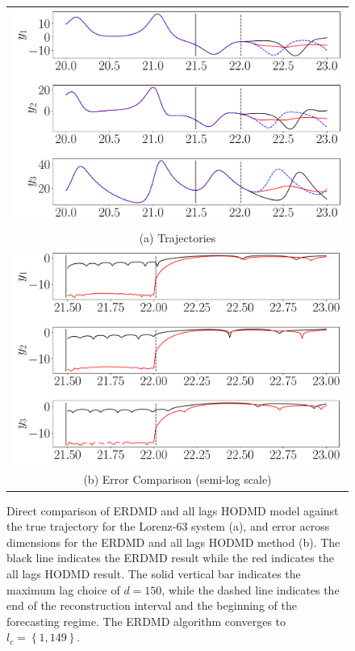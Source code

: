 \documentclass[a4paper,11pt]{article}
\begin{document}
\begin{figure}[!h]
\centering
\begin{tabular}{c}
\includegraphics[width=.8\textwidth]{Lorenz_compare_w_mx_lag_150}\\
(a) Trajectories\\
\includegraphics[width=.8\textwidth]{Lorenz_error_compare_w_mx_lag_150}\\
(b) Error Comparison (semi-log scale)
\end{tabular}
\caption{Direct comparison of ERDMD and all lags HODMD model against the true trajectory for the Lorenz-63 system (a), and error across dimensions for the ERDMD and all lags HODMD method (b).  The black line indicates the ERDMD result while the red indicates the all lags HODMD result.  The solid vertical bar indicates the maximum lag choice of $d=150$, while the dashed line indicates the end of the reconstruction interval and the beginning of the forecasting regime. The ERDMD algorithm converges to $l_{c}=\left\{1,149\right\}$.}
\label{fig:lorenz_compare_d_150}
\end{figure}
\end{document}
